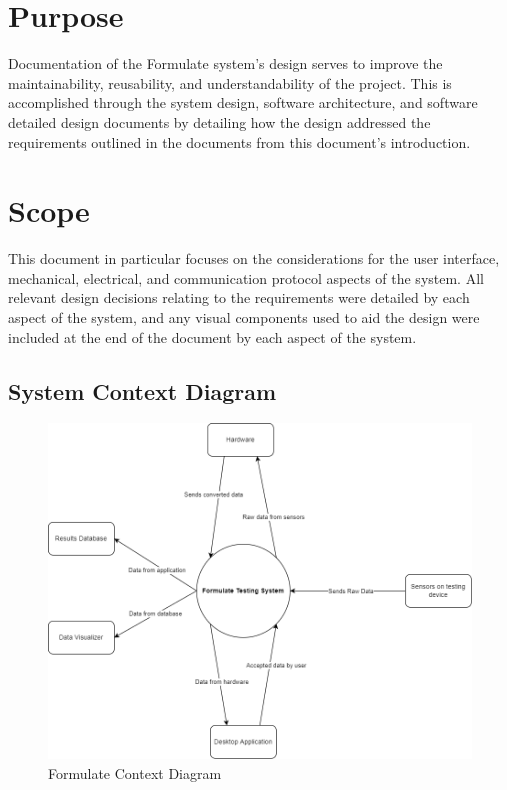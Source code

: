 \documentclass[12pt, titlepage]{article}
\begin{document}

\section{Purpose}



Documentation of the Formulate system's design serves to improve the maintainability, reusability, and understandability of the project. This is accomplished through the system design, software architecture, and software detailed design documents by detailing how the design addressed the requirements outlined in the documents from this document's introduction. \\

\section{Scope}


This document in particular focuses on the considerations for the user interface, mechanical, electrical, and communication protocol aspects of the system. All relevant design decisions relating to the requirements were detailed by each aspect of the system, and any visual components used to aid the design were included at the end of the document by each aspect of the system. \\ 

\newpage

\subsection{System Context Diagram}
\begin{figure}[h!]
  \begin{center}
  \includegraphics[width=1.1\textwidth]{sys_context_diagram}
  \caption{Formulate Context Diagram}
  \end{center}
  \end{figure}
  \newpage
\end{document}

